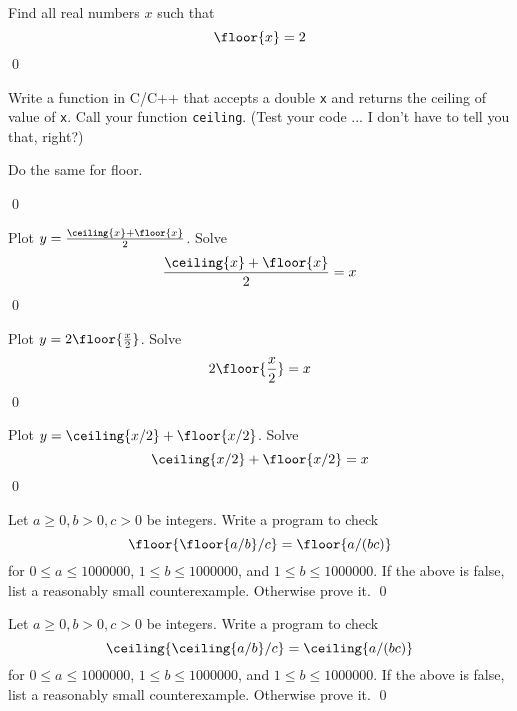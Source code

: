 \begin{ex}
Find all real numbers $x$ such that
\[
\floor{x} = 2
\]
\qed
\end{ex}




\begin{ex}
  \mbox{}
\begin{tightlist}
\item Write a function in C/C++ that accepts a double \verb!x! and returns the
ceiling of value of \verb!x!. Call your function \verb!ceiling!.
(Test your code ... I don't have to tell you that, right?)
\item Do the same for floor.
\end{tightlist}
\qed
\end{ex}


\begin{ex}
Plot $y = \frac{\ceiling{x} + \floor{x}}{2}$.
Solve
\[
\frac{\ceiling{x} + \floor{x}}{2} = x
\]
\qed
\end{ex}


\begin{ex}
Plot $y = 2 \floor{\frac{x}{2}}$.
Solve
\[
2 \floor{\frac{x}{2}} = x
\]
\qed
\end{ex}

\begin{ex}
Plot $y = \ceiling{x/2} + \floor{x/2}$.
Solve
\[
\ceiling{x/2} + \floor{x/2} = x
\]
\qed
\end{ex}


\begin{ex} Let $a \geq 0, b > 0, c > 0$ be integers.
Write a program to check
\[
\floor{\floor{a/b}/c} = \floor{a/(bc)}
\]
for 
$0 \leq a \leq 1000000$, 
$1 \leq b \leq 1000000$, 
and
$1 \leq b \leq 1000000$.
If the above is false, list a reasonably small counterexample.
Otherwise prove it.
\qed
\end{ex}

\begin{ex} Let $a \geq 0, b > 0, c > 0$ be integers.
Write a program to check
\[
\ceiling{\ceiling{a/b}/c} = \ceiling{a/(bc)}
\]
for 
$0 \leq a \leq 1000000$, 
$1 \leq b \leq 1000000$, 
and
$1 \leq b \leq 1000000$.
If the above is false, list a reasonably small counterexample.
Otherwise prove it.
\qed
\end{ex}

